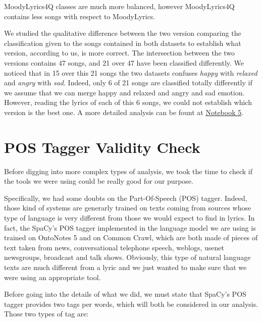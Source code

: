 MoodyLyrics4Q classes are much more balanced, however MoodyLyrics4Q contains less songs with respect to MoodyLyrics. \par
We studied the qualitative difference between the two version comparing the classification given to the songs contained in both datasets to establish what version, according to us, is more correct. The intersection between the two versions contains 47 songs, and 21 over 47 have been classified differently. We noticed that in 15 over this 21 songs the two datasets confuses \textit{happy} with \textit{relaxed} and \textit{angry} with \textit{sad}. Indeed, only 6 of 21 songs are classified totally differently if we assume that we can merge happy and relaxed and angry and sad emotion. However, reading the lyrics of each of this 6 songs, we could not establish which version is the best one. A more detailed analysis can be fount at \href{https://github.com/sgiammy/emotion-patterns-in-music-playlists/blob/master/Notebook/5_Final_steps.ipynb}{Notebook 5}. 

\section{POS Tagger Validity Check} 

Before digging into more complex types of analysis, we took the time to check if
the tools we were using could be really good for our purpose. \par

Specifically, we had some doubts on the Part-Of-Speech (POS) tagger. Indeed, those kind of systems are generarly 
trained on texts coming from sources whose type of language is very different from those
we would expect to find in lyrics. In fact, the SpaCy's POS tagger implemented in the language
model we are using is trained on OntoNotes 5\cite{ontonotes5} and on Common Crawl\cite{common-crawl},
which are both made of pieces of text taken from news, conversational telephone speech, weblogs, 
usenet newsgroups, broadcast and talk shows. Obviously, this type of natural language texts are 
much different from a lyric and we just wanted to make sure that we were using an appropriate tool.

Before going into the details of what we did, we must state that SpaCy's POS tagger provides two tags per words, which
will both be considered in our analysis. Those two types of tag are:

